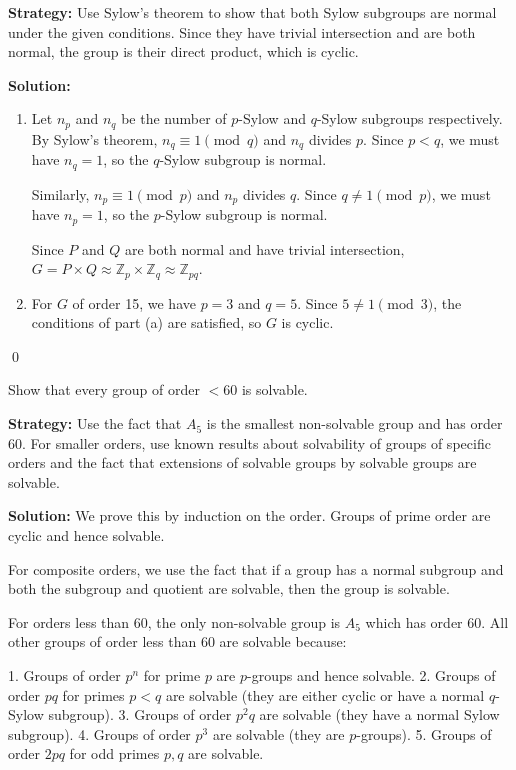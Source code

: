 \noindent\textbf{Strategy:} Use Sylow's theorem to show that both Sylow subgroups are normal under the given conditions. Since they have trivial intersection and are both normal, the group is their direct product, which is cyclic.

\noindent\textbf{Solution:}
\begin{enumerate}[label=(\alph*)]
\item Let $n_p$ and $n_q$ be the number of $p$-Sylow and $q$-Sylow subgroups respectively. By Sylow's theorem, $n_q \equiv 1 \pmod{q}$ and $n_q$ divides $p$. Since $p < q$, we must have $n_q = 1$, so the $q$-Sylow subgroup is normal.

Similarly, $n_p \equiv 1 \pmod{p}$ and $n_p$ divides $q$. Since $q \neq 1 \pmod{p}$, we must have $n_p = 1$, so the $p$-Sylow subgroup is normal.

Since $P$ and $Q$ are both normal and have trivial intersection, $G = P \times Q \approx \mathbb{Z}_p \times \mathbb{Z}_q \approx \mathbb{Z}_{pq}$.

\item For $G$ of order 15, we have $p = 3$ and $q = 5$. Since $5 \neq 1 \pmod{3}$, the conditions of part (a) are satisfied, so $G$ is cyclic.
\end{enumerate}


\qed
\begin{problembox}
Show that every group of order $< 60$ is solvable.
\end{problembox}

\noindent\textbf{Strategy:} Use the fact that $A_5$ is the smallest non-solvable group and has order 60. For smaller orders, use known results about solvability of groups of specific orders and the fact that extensions of solvable groups by solvable groups are solvable.

\noindent\textbf{Solution:} We prove this by induction on the order. Groups of prime order are cyclic and hence solvable.

For composite orders, we use the fact that if a group has a normal subgroup and both the subgroup and quotient are solvable, then the group is solvable.

For orders less than 60, the only non-solvable group is $A_5$ which has order 60. All other groups of order less than 60 are solvable because:

1. Groups of order $p^n$ for prime $p$ are $p$-groups and hence solvable.
2. Groups of order $pq$ for primes $p < q$ are solvable (they are either cyclic or have a normal $q$-Sylow subgroup).
3. Groups of order $p^2q$ are solvable (they have a normal Sylow subgroup).
4. Groups of order $p^3$ are solvable (they are $p$-groups).
5. Groups of order $2pq$ for odd primes $p, q$ are solvable.

